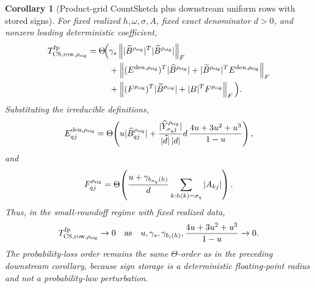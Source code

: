 \documentclass[11pt]{article}
\newcommand{\Frob}[1]{\left\lVert #1\right\rVert_F}
\newtheorem{corollary}[theorem]{Corollary}
\theoremstyle{remark}
\begin{document}
\begin{corollary}[Product-grid CountSketch plus downstream uniform rows with stored signs]
For fixed realized \(h,\omega,\sigma,A\), fixed exact denominator \(d>0\),
and nonzero leading deterministic coefficient,
\[
  \begin{aligned}
  T_{{\rm CS,row},\rho_{\rm sig}}^{\rm fp}
  =
  \Theta\!\Big(
  &\gamma_s
      \Frob{|\widehat B^{\rho_{\rm sig}}|^T
            |\widehat B^{\rho_{\rm sig}}|}
  \\
  &+
    \Frob{(E^{{\rm den},\rho_{\rm sig}})^T
          |\widehat B^{\rho_{\rm sig}}|
          +
          |\widetilde B^{\rho_{\rm sig}}|^T
          E^{{\rm den},\rho_{\rm sig}}}
  \\
  &+
    \Frob{(F^{\rho_{\rm sig}})^T
          |\widetilde B^{\rho_{\rm sig}}|
          +
          |B|^TF^{\rho_{\rm sig}}}
  \Big).
  \end{aligned}
\]
Substituting the irreducible definitions,
\[
  E^{{\rm den},\rho_{\rm sig}}_{qj}
  =
  \Theta\!\left(
    u|\widehat B^{\rho_{\rm sig}}_{qj}|
    +
    \frac{|\widehat Y^{\rho_{\rm sig}}_{\sigma_qj}|}{|\widehat d|\,|d|}
    d\,\frac{4u+3u^2+u^3}{1-u}
  \right),
\]
and
\[
  F^{\rho_{\rm sig}}_{qj}
  =
  \Theta\!\left(
    \frac{u+\gamma_{b_{\sigma_q}(h)}}{d}
    \sum_{k:h(k)=\sigma_q}|A_{kj}|
  \right).
\]
Thus, in the small-roundoff regime with fixed realized data,
\[
  T_{{\rm CS,row},\rho_{\rm sig}}^{\rm fp}
  \to0
  \quad\text{as}\quad
  u,\gamma_s,\gamma_{b_i(h)},\frac{4u+3u^2+u^3}{1-u}\to0.
\]
The probability-loss order remains the same \(\Theta\)-order as in the
preceding downstream corollary, because sign storage is a deterministic
floating-point radius and not a probability-law perturbation.
\end{corollary}
\end{document}
